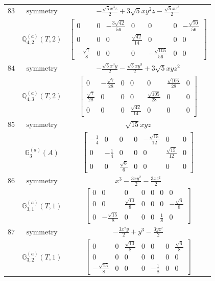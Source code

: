 \documentclass[fleqn,8pt,landscape]{jsarticle}
\begin{document}
\begin{longtable}{ccc}
$ 83 $ & $ \text{symmetry} $ & $ - \frac{\sqrt{5} x^{3} z}{2} + 3 \sqrt{5} x y^{2} z - \frac{\sqrt{5} x z^{3}}{2} $ \\
$  $ & $ \mathbb{Q}_{4,2}^{(a)}(T,2) $ & $ \begin{bmatrix} 0 & 0 & - \frac{3 \sqrt{42}}{56} & 0 & 0 & 0 & - \frac{\sqrt{70}}{56} \\ 0 & 0 & 0 & \frac{\sqrt{42}}{14} & 0 & 0 & 0 \\ - \frac{\sqrt{7}}{8} & 0 & 0 & 0 & - \frac{\sqrt{105}}{56} & 0 & 0 \end{bmatrix} $ \\ \hline
$ 84 $ & $ \text{symmetry} $ & $ - \frac{\sqrt{5} x^{3} y}{2} - \frac{\sqrt{5} x y^{3}}{2} + 3 \sqrt{5} x y z^{2} $ \\
$  $ & $ \mathbb{Q}_{4,3}^{(a)}(T,2) $ & $ \begin{bmatrix} 0 & - \frac{\sqrt{7}}{28} & 0 & 0 & 0 & \frac{\sqrt{105}}{28} & 0 \\ \frac{\sqrt{7}}{28} & 0 & 0 & 0 & \frac{\sqrt{105}}{28} & 0 & 0 \\ 0 & 0 & 0 & \frac{\sqrt{42}}{14} & 0 & 0 & 0 \end{bmatrix} $ \\ \hline
$ 85 $ & $ \text{symmetry} $ & $ \sqrt{15} x y z $ \\
$  $ & $ \mathbb{G}_{3}^{(a)}(A) $ & $ \begin{bmatrix} - \frac{1}{4} & 0 & 0 & 0 & - \frac{\sqrt{15}}{12} & 0 & 0 \\ 0 & - \frac{1}{4} & 0 & 0 & 0 & \frac{\sqrt{15}}{12} & 0 \\ 0 & 0 & \frac{\sqrt{6}}{6} & 0 & 0 & 0 & 0 \end{bmatrix} $ \\ \hline
$ 86 $ & $ \text{symmetry} $ & $ x^{3} - \frac{3 x y^{2}}{2} - \frac{3 x z^{2}}{2} $ \\
$  $ & $ \mathbb{G}_{3,1}^{(a)}(T,1) $ & $ \begin{bmatrix} 0 & 0 & 0 & 0 & 0 & 0 & 0 \\ 0 & 0 & \frac{\sqrt{10}}{8} & 0 & 0 & 0 & - \frac{\sqrt{6}}{8} \\ 0 & - \frac{\sqrt{15}}{8} & 0 & 0 & 0 & \frac{1}{8} & 0 \end{bmatrix} $ \\ \hline
$ 87 $ & $ \text{symmetry} $ & $ - \frac{3 x^{2} y}{2} + y^{3} - \frac{3 y z^{2}}{2} $ \\
$  $ & $ \mathbb{G}_{3,2}^{(a)}(T,1) $ & $ \begin{bmatrix} 0 & 0 & \frac{\sqrt{10}}{8} & 0 & 0 & 0 & \frac{\sqrt{6}}{8} \\ 0 & 0 & 0 & 0 & 0 & 0 & 0 \\ - \frac{\sqrt{15}}{8} & 0 & 0 & 0 & - \frac{1}{8} & 0 & 0 \end{bmatrix} $ \\ \hline

\end{longtable}
\end{document}
